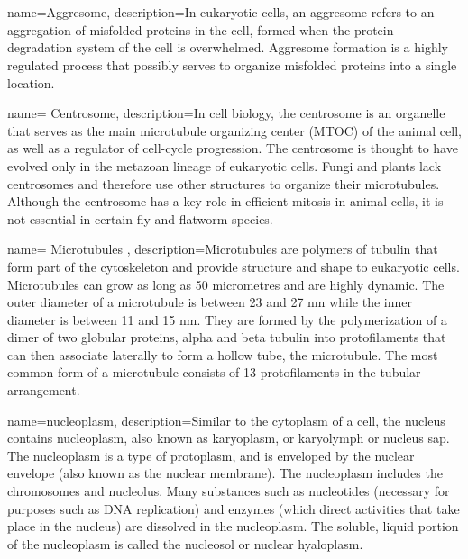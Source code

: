 \documentclass[]{article}
\title{}
\author{}
\begin{document}
\maketitle

\begin{abstract}

\end{abstract}
\tableofcontents
\section{}



 {
	name=Aggresome,
	description={In eukaryotic cells, an aggresome refers to an aggregation of misfolded proteins in the cell, formed when the protein degradation system of the cell is overwhelmed. Aggresome formation is a highly regulated process that possibly serves to organize misfolded proteins into a single location.}
}


 {
	name= Centrosome,
	description={In cell biology, the centrosome is an organelle that serves as the main microtubule organizing center (MTOC) of the animal cell, as well as a regulator of cell-cycle progression. The centrosome is thought to have evolved only in the metazoan lineage of eukaryotic cells. Fungi and plants lack centrosomes and therefore use other structures to organize their microtubules. Although the centrosome has a key role in efficient mitosis in animal cells, it is not essential in certain fly and flatworm species. }
}

 {
	name= Microtubules ,
	description={Microtubules are polymers of tubulin that form part of the cytoskeleton and provide structure and shape to eukaryotic cells. Microtubules can grow as long as 50 micrometres and are highly dynamic. The outer diameter of a microtubule is between 23 and 27 nm while the inner diameter is between 11 and 15 nm. They are formed by the polymerization of a dimer of two globular proteins, alpha and beta tubulin into protofilaments that can then associate laterally to form a hollow tube, the microtubule. The most common form of a microtubule consists of 13 protofilaments in the tubular arrangement.}
}

 {
	name=nucleoplasm,
	description={Similar to the cytoplasm of a cell, the nucleus contains nucleoplasm, also known as karyoplasm, or karyolymph or nucleus sap. The nucleoplasm is a type of protoplasm, and is enveloped by the nuclear envelope (also known as the nuclear membrane). The nucleoplasm includes the chromosomes and nucleolus. Many substances such as nucleotides (necessary for purposes such as DNA replication) and enzymes (which direct activities that take place in the nucleus) are dissolved in the nucleoplasm. The soluble, liquid portion of the nucleoplasm is called the nucleosol or nuclear hyaloplasm.}
}
\end{document}
